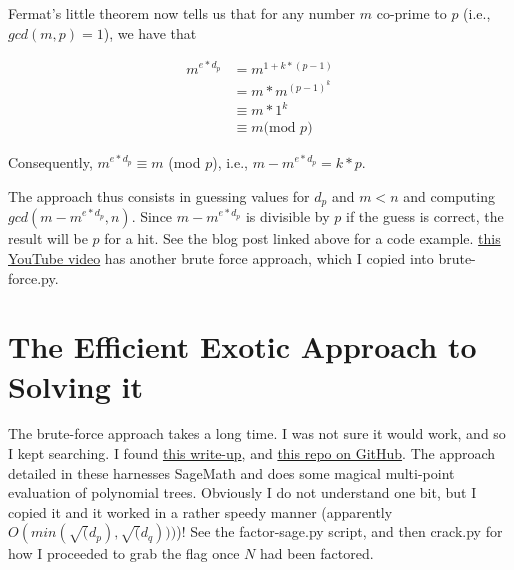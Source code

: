 \documentclass{article}
\begin{document}
Fermat's little theorem now tells us that for any number $m$ co-prime to $p$ (i.e., $gcd(m,p)=1$), we have that

\begin{align*}
    m^{e*d_p} &= m^{1+k*(p-1)}\\
              &= m*m^{(p-1)^k}\\
              &\equiv m*1^k  \\
              &\equiv m \text{(mod $p$)}
\end{align*}

Consequently, $m^{e*d_p} \equiv m$ (mod $p$), i.e., $m-m^{e*d_p} = k*p$. 

\medskip

The approach thus consists in guessing values for $d_p$ and $m < n$ and computing $gcd(m-m^{e*d_p},n)$. Since $m-m^{e*d_p}$ is divisible by $p$ if the guess is correct, the result will be $p$ for a hit. See the blog post linked above for a code example. \href{https://www.youtube.com/watch?v=i7KtIHyHCgE} {this YouTube video} has another brute force approach, which I copied into brute-force.py.

\section{The Efficient Exotic Approach to Solving it}

The brute-force approach takes a long time. I was not sure it would work, and so I kept searching. I found \href{https://ctftime.org/writeup/27022}{this write-up}, and \href{https://github.com/rkm0959/rkm0959_implements/tree/main/Sqrt_Attack_CRT-RSA}{this repo on GitHub}. The approach detailed in these harnesses SageMath and does some magical multi-point evaluation of polynomial trees. Obviously I do not understand one bit, but I copied it and it worked in a rather speedy manner (apparently $O(min(\sqrt(d_p), \sqrt(d_q)))$)! See the factor-sage.py script, and then crack.py for how I proceeded to grab the flag once $N$ had been factored.
\end{document}
